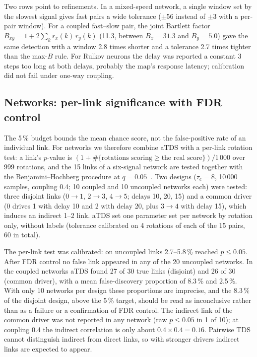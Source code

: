 \documentclass[11pt,a4paper]{article}
\begin{document}
Two rows point to refinements. In a mixed-speed network, a single window set by the slowest signal gives fast pairs a wide tolerance ($\pm56$ instead of $\pm3$ with a per-pair window). For a coupled fast--slow pair, the joint Bartlett factor $B_{xy} = 1 + 2\sum_k r_x(k)\, r_y(k)$ (11.3, between $B_x = 31.3$ and $B_y = 5.0$) gave the same detection with a window 2.8 times shorter and a tolerance 2.7 times tighter than the max-$B$ rule. For Rulkov neurons the delay was reported a constant 3 steps too long at both delays, probably the map's response latency; calibration did not fail under one-way coupling.

\subsection{Networks: per-link significance with FDR control}
\label{sec:res-network}
The 5\,\% budget bounds the mean chance score, not the false-positive rate of an individual link. For networks we therefore combine aTDS with a per-link rotation test: a link's $p$-value is $(1 + \#\{\text{rotations scoring} \ge \text{the real score}\}) / 1\,000$ over 999 rotations, and the 15 links of a six-signal network are tested together with the Benjamini--Hochberg procedure at $q = 0.05$~\cite{Benjamini1995ControllingFalse}. Two designs ($\tau_c = 8$, 10\,000 samples, coupling 0.4; 10 coupled and 10 uncoupled networks each) were tested: three disjoint links ($0\to1$, $2\to3$, $4\to5$; delays 10, 20, 15) and a common driver (0 drives 1 with delay 10 and 2 with delay 20, plus $3\to4$ with delay 15), which induces an indirect 1--2 link. aTDS set one parameter set per network by rotation only, without labels (tolerance calibrated on 4 rotations of each of the 15 pairs, 60 in total).

The per-link test was calibrated: on uncoupled links 2.7--5.8\,\% reached $p \le 0.05$. After FDR control no false link appeared in any of the 20 uncoupled networks. In the coupled networks aTDS found 27 of 30 true links (disjoint) and 26 of 30 (common driver), with a mean false-discovery proportion of 8.3\,\% and 2.5\,\%. With only 10 networks per design these proportions are imprecise, and the 8.3\,\% of the disjoint design, above the 5\,\% target, should be read as inconclusive rather than as a failure or a confirmation of FDR control. The indirect link of the common driver was not reported in any network (raw $p \le 0.05$ in 1 of 10); at coupling 0.4 the indirect correlation is only about $0.4 \times 0.4 = 0.16$. Pairwise TDS cannot distinguish indirect from direct links, so with stronger drivers indirect links are expected to appear.
\end{document}
